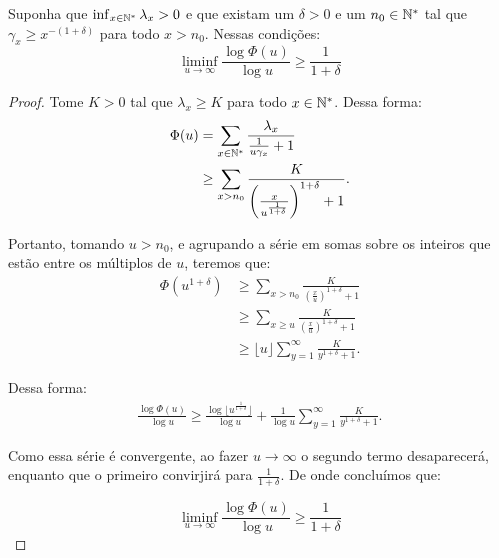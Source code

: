 \begin{proposicao}
  Suponha que $\inf_{x\in{\mathbb{N^*}}}\lambda_x  > 0$ e que existam um
  $\delta>0$ e um $n_0 \in {\mathbb{N^*}}$ tal que $\gamma_x \geq x^{-(1+\delta)}$
  para todo $x > n_0$. Nessas condições:
  \begin{equation}
    \liminf_{u \to \infty} \frac{\log \Phi(u)}{\log u}  \geq \frac{1}{1+\delta}
  \end{equation}
\end{proposicao}

\begin{proof}
  Tome $K > 0$ tal que $\lambda_x \geq K$ para todo $x \in {\mathbb{N^*}}$. Dessa
  forma:
  \begin{align*}
    \Phi(u) &= \sum_{x \in {\mathbb{N^*}}} \frac{\lambda_x}{\frac{1}{u\gamma_x} +
      1}\\
    &\geq \sum_{x > n_0}
    \frac{K}{\left(\frac{x}{u^{\frac{1}{1+\delta}}}\right)^{1+\delta} +1}.
  \end{align*}

  Portanto, tomando $u > n_0$, e agrupando a série em somas sobre os inteiros
  que estão entre os múltiplos de $u$, teremos que:
  \begin{align*}
    \Phi(u^{1+\delta}) 
    &\geq \sum_{x > n_0}
    \frac{K}{\left(\frac{x}{u}\right)^{1+\delta} +1}\\
    &\geq \sum_{x \geq u}
    \frac{K}{\left(\frac{x}{u}\right)^{1+\delta} +1}\\
    &\geq \lfloor u \rfloor \sum_{y = 1}^{\infty}
    \frac{K}{y^{1+\delta} + 1}.
  \end{align*}

  Dessa forma:
  \begin{align*}
    \frac{\log \Phi(u)}{\log u} \geq \frac{\log\lfloor
      u^{\frac{1}{1+\delta}} \rfloor }{\log u} + 
    \frac{1}{\log u} \sum_{y = 1}^{\infty}
    \frac{K}{y^{1+\delta} + 1}.
  \end{align*}

  Como essa série é convergente, ao fazer $u \to \infty$ o segundo
  termo desaparecerá, enquanto que o primeiro convirjirá para
  $\frac{1}{1+\delta}$. De onde concluímos que:

  \begin{displaymath}
    \liminf_{u \to \infty} \frac{\log \Phi (u)}{\log u} \geq \frac{1}{1+\delta}
  \end{displaymath}
\end{proof}

